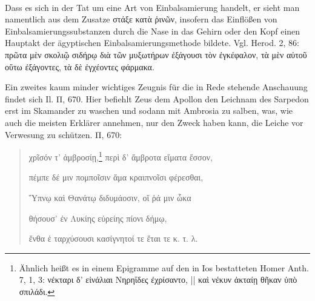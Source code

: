 \documentclass[a4paper, 11pt, oneside]{article}
\begin{document}
\paragraph{}
Dass es sich in der Tat um eine Art von Einbalsamierung handelt, er sieht man namentlich aus dem Zusatze στάξε κατὰ ῥινῶν, insofern das Einflößen von Einbalsamierungssubstanzen durch die Nase in das Gehirn oder den Kopf einen Hauptakt der ägyptischen Einbalsamierungsmethode bildete. Vgl. Herod. 2, 86: πρῶτα μὲν σκολιῷ σιδήρῳ διὰ τῶν μυξωτήρων ἐξάγουσι τὸν ἐγκέφαλον, τὰ μὲν αὐτοῦ οὕτω ἐξάγοντες, τὰ δὲ ἐγχέοντες φάρμακα.

Ein zweites kaum minder wichtiges Zeugnis für die in Rede stehende Anschauung findet sich Il. Π, 670. Hier befiehlt Zeus dem Apollon den Leichnam des Sarpedon erst im Skamander zu waschen und sodann mit Ambrosia zu salben, was, wie auch die meisten Erklärer annehmen, nur den Zweck haben kann, die Leiche vor Verwesung zu schützen. Π, 670:
\begin{quotation}
χρῖσόν τ' ἀμβροσίῃ,\footnote{Ähnlich heißt es in einem Epigramme auf den in Ios bestatteten Homer Anth. 7, 1, 3: νέκταρι δ' εἰνάλιαι Νηρηΐδες ἐχρίσαντο, || καὶ νέκυν ἀκταίῃ θῆκαν ὑπὸ σπιλάδι.} περὶ δ' ἄμβροτα εἴματα ἕσσον,

πέμπε δέ μιν πομποῖσιν ἅμα κραιπνοῖσι φέρεσθαι,

Ὕπνῳ καὶ Θανάτῳ διδυμάοσιν, οἵ ῥά μιν ὦκα

θήσουσ' ἐν Λυκίης εὐρείης πίονι δήμῳ,

ἔνθα ἑ ταρχύσουσι κασίγνητοί τε ἔται τε κ. τ. λ.
\end{quotation}
\end{document}
